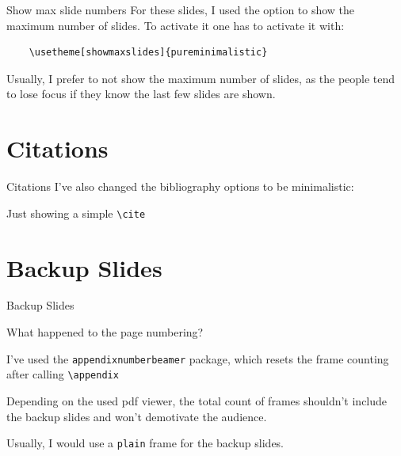 \documentclass{article}
\begin{document}
\begin{frame}[fragile]{Show max slide numbers}
  For these slides, I used the option to
  show the maximum number of slides. To activate it
  one has to activate it with:
  \begin{verbatim}
    \usetheme[showmaxslides]{pureminimalistic}
  \end{verbatim}
  Usually, I prefer to not show the maximum number of
  slides, as the people tend to lose focus if they know
  the last few slides are shown.
\end{frame}

\section{Citations}
\begin{frame}{Citations}
  I've also changed the bibliography options to be minimalistic:

  Just showing a simple \texttt{\textbackslash{}cite} \cite{AlexNet}
  \vfill 
  \printbibliography
\end{frame}


\section*{Backup Slides}
\begin{frame}
  \centering
  \vfill
  {\fontsize{40}{50}\selectfont Backup Slides}
  \vfill
\end{frame}

\begin{frame}{What happened to the page numbering?}
  \begin{vfilleditems}
    \item I've used the \texttt{appendixnumberbeamer}
    package, which resets the frame counting after calling
    \texttt{\textbackslash{}appendix}
    \item Depending on the used pdf viewer, the total
    count of frames shouldn't include the backup slides and
    won't demotivate the audience.
    \item Usually, I would use a \texttt{plain} frame
    for the backup slides.
  \end{vfilleditems}
\end{frame}
\end{document}
